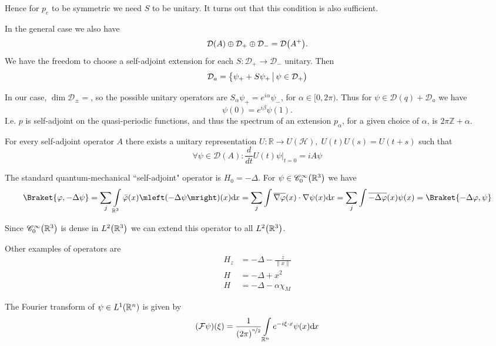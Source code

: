 \documentclass[12pt]{article}
\numberwithin{equation}{section}
\theoremstyle{plain}
\theoremstyle{plain}
\renewcommand{\d}{\mathrm{d}\hspace{-0.025cm}}
\renewcommand{\phi}{\varphi}
\begin{document}
	Hence for $p_e$ to be symmetric we need $S$ to be unitary. It turns out that this condition is also sufficient.


In the general case we also have 
\[
	\mathcal D \mleft( A \mright) \oplus \mathcal D_+ \oplus \mathcal D_- = \mathcal{D} \mleft(A^+ \mright).
\]
We have the freedom to choose a self-adjoint extension for each $S: \mathcal D_+ \rightarrow \mathcal D_-$ unitary. Then 
\[
	\mathcal D_a = \mleft\{ \psi_+ + S \psi_+ \, \big| \, \psi \in \mathcal D_+ \mright)
\]

In our case, $\dim \mathcal D_{\pm} = $, so the possible unitary operators are $S_{\alpha}\psi_+ = e^{i \alpha} \psi_-$, for $\alpha \in [0,2\pi)$. Thus for $\psi \in \mathcal D(q) + \mathcal D_a$ we have
\[
	\psi(0) = e^{i \beta} \psi(1).
\]
I.e. $p$ is self-adjoint on the quasi-periodic functions, and thus the spectrum of an extension $p_{\alpha}$, for a given choice of $\alpha$, is $2\pi \mathbb Z + \alpha$.

\begin{theorem*}
		For every self-adjoint operator $A$ there exists a unitary representation $U: \mathbb{R} \rightarrow U (\mathcal H), \; U (t) U(s) = U(t+s) $ such that 
		\[
			\forall \psi \in \mathcal D(A): \frac{d}{d t} U(t) \psi \Big|_{t=0} = i A \psi		
		\]
\end{theorem*}

\newpage


The standard quantum-mechanical ``self-adjoint" operator is $H_0 = - \Delta$. For $\psi \in \mathscr C_0^{\infty} \mleft( \mathbb{R}^3 \mright)$ we have
\[
	\Braket{\phi,-\Delta \psi} = \sum_{j} \int\limits_{\mathbb{R}^3} \bar\phi(x) \mleft( - \Delta \psi \mright)(x) \d x = \sum_j \int \overline{ \nabla \phi}(x) \cdot \nabla \psi(x) \d x = \sum_j \int \overline{- \Delta \phi}(x)\psi(x) = \Braket{-\Delta \phi , \psi}
\]

Since $\mathscr C_0^{\infty} \mleft( \mathbb{R}^3 \mright)$ is dense in $L^2 \mleft( \mathbb{R}^3 \mright)$ we can extend this operator to all $L^2\mleft( \mathbb{R}^3 \mright)$.

Other examples of operators are 
\begin{align*}
	H_z &= - \Delta - \frac{z}{\|x\|}\\
	H & = - \Delta + x^2\\
	H& = - \Delta - \alpha \chi_M
\end{align*}

\begin{defn}
	The Fourier transform of $\psi \in L^1\mleft( \mathbb R^n \mright) $ is given by 
	\[
		\mleft(\mathcal F \psi \mright)(\xi) = \frac{1}{\mleft(2\pi \mright)^{\nicefrac{n}{2}}} \int\limits_{\mathbb{R}^n} e^{- i \xi \cdot x} \psi(x) \d x 
	\]
\end{defn}
\end{document}
